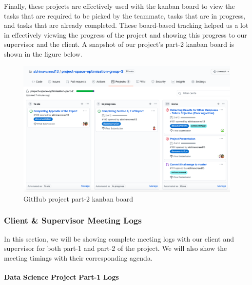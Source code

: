 Finally, these projects are effectively used with the kanban board to view the tasks that are required to be picked by the teammate, tasks that are in progress, and tasks that are already completed. These board-based tracking helped us a lot in effectively viewing the progress of the project and showing this progress to our supervisor and the client. A snapshot of our project's part-2 kanban board is shown in the figure below.

\begin{figure}[H]
\centering
\includegraphics[width=14cm]{resources/images/github/github7.png}
\caption{GitHub project part-2 kanban board}
\label{fig:github7}
\end{figure}

\subsubsection{Client \& Supervisor Meeting Logs}

In this section, we will be showing complete meeting logs with our client and supervisor for both part-1 and part-2 of the project. We will also show the meeting timings with their corresponding agenda.

\paragraph{Data Science Project Part-1 Logs}

